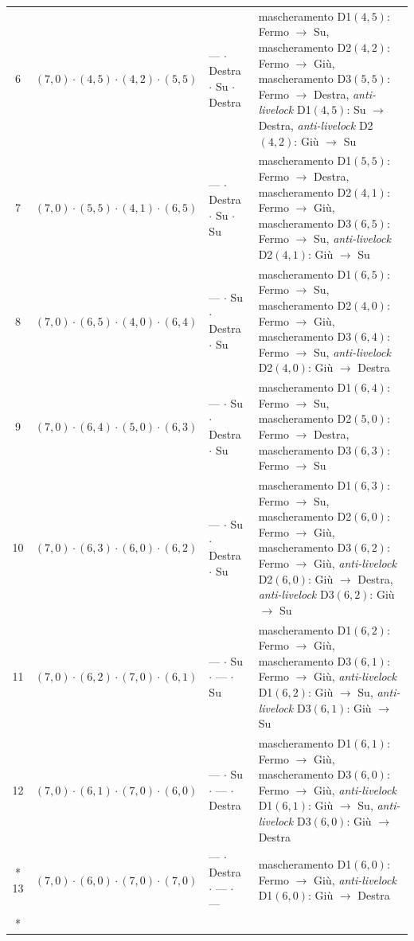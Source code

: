 \documentclass[12pt,a4paper,twoside]{report}
\begin{document}
{\begin{longtable}{c l l >{\raggedright\arraybackslash}p{3.8cm}}
6  & $(7, 0) \cdot (4, 5) \cdot (4, 2) \cdot (5, 5)$ & --- $\cdot$ Destra $\cdot$ Su $\cdot$ Destra & mascheramento D1$(4, 5)$: Fermo $\to$ Su, mascheramento D2$(4, 2)$: Fermo $\to$ Giù, mascheramento D3$(5, 5)$: Fermo $\to$ Destra, \emph{anti-livelock} D1$(4, 5)$: Su $\to$ Destra, \emph{anti-livelock} D2$(4, 2)$: Giù $\to$ Su \\
7  & $(7, 0) \cdot (5, 5) \cdot (4, 1) \cdot (6, 5)$ & --- $\cdot$ Destra $\cdot$ Su $\cdot$ Su     & mascheramento D1$(5, 5)$: Fermo $\to$ Destra, mascheramento D2$(4, 1)$: Fermo $\to$ Giù, mascheramento D3$(6, 5)$: Fermo $\to$ Su, \emph{anti-livelock} D2$(4, 1)$: Giù $\to$ Su \\
8  & $(7, 0) \cdot (6, 5) \cdot (4, 0) \cdot (6, 4)$ & --- $\cdot$ Su $\cdot$ Destra $\cdot$ Su     & mascheramento D1$(6, 5)$: Fermo $\to$ Su, mascheramento D2$(4, 0)$: Fermo $\to$ Giù, mascheramento D3$(6, 4)$: Fermo $\to$ Su, \emph{anti-livelock} D2$(4, 0)$: Giù $\to$ Destra \\
9  & $(7, 0) \cdot (6, 4) \cdot (5, 0) \cdot (6, 3)$ & --- $\cdot$ Su $\cdot$ Destra $\cdot$ Su     & mascheramento D1$(6, 4)$: Fermo $\to$ Su, mascheramento D2$(5, 0)$: Fermo $\to$ Destra, mascheramento D3$(6, 3)$: Fermo $\to$ Su \\
10 & $(7, 0) \cdot (6, 3) \cdot (6, 0) \cdot (6, 2)$ & --- $\cdot$ Su $\cdot$ Destra $\cdot$ Su     & mascheramento D1$(6, 3)$: Fermo $\to$ Su, mascheramento D2$(6, 0)$: Fermo $\to$ Giù, mascheramento D3$(6, 2)$: Fermo $\to$ Giù, \emph{anti-livelock} D2$(6, 0)$: Giù $\to$ Destra, \emph{anti-livelock} D3$(6, 2)$: Giù $\to$ Su \\
11 & $(7, 0) \cdot (6, 2) \cdot (7, 0) \cdot (6, 1)$ & --- $\cdot$ Su $\cdot$ --- $\cdot$ Su        & mascheramento D1$(6, 2)$: Fermo $\to$ Giù, mascheramento D3$(6, 1)$: Fermo $\to$ Giù, \emph{anti-livelock} D1$(6, 2)$: Giù $\to$ Su, \emph{anti-livelock} D3$(6, 1)$: Giù $\to$ Su \\
12 & $(7, 0) \cdot (6, 1) \cdot (7, 0) \cdot (6, 0)$ & --- $\cdot$ Su $\cdot$ --- $\cdot$ Destra    & mascheramento D1$(6, 1)$: Fermo $\to$ Giù, mascheramento D3$(6, 0)$: Fermo $\to$ Giù, \emph{anti-livelock} D1$(6, 1)$: Giù $\to$ Su, \emph{anti-livelock} D3$(6, 0)$: Giù $\to$ Destra \\*
13 & $(7, 0) \cdot (6, 0) \cdot (7, 0) \cdot (7, 0)$ & --- $\cdot$ Destra $\cdot$ --- $\cdot$ ---   & mascheramento D1$(6, 0)$: Fermo $\to$ Giù, \emph{anti-livelock} D1$(6, 0)$: Giù $\to$ Destra \\*
\end{longtable}
}
\end{document}
